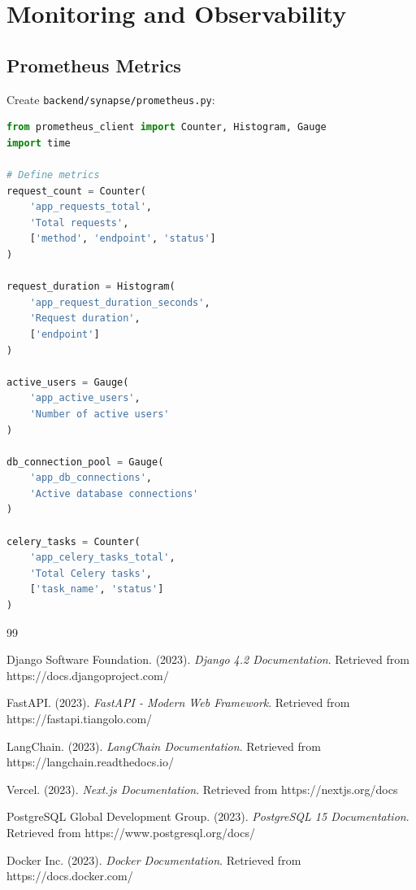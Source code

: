 \documentclass{report}
\begin{document}
\chapter{Monitoring and Observability}

\section{Prometheus Metrics}

Create \texttt{backend/synapse/prometheus.py}:

\begin{lstlisting}[language=python, caption=Prometheus metrics setup]
from prometheus_client import Counter, Histogram, Gauge
import time

# Define metrics
request_count = Counter(
    'app_requests_total',
    'Total requests',
    ['method', 'endpoint', 'status']
)

request_duration = Histogram(
    'app_request_duration_seconds',
    'Request duration',
    ['endpoint']
)

active_users = Gauge(
    'app_active_users',
    'Number of active users'
)

db_connection_pool = Gauge(
    'app_db_connections',
    'Active database connections'
)

celery_tasks = Counter(
    'app_celery_tasks_total',
    'Total Celery tasks',
    ['task_name', 'status']
)
\end{lstlisting}

\begin{thebibliography}{99}

 Django Software Foundation. (2023). \textit{Django 4.2 Documentation}. Retrieved from https://docs.djangoproject.com/

 FastAPI. (2023). \textit{FastAPI - Modern Web Framework}. Retrieved from https://fastapi.tiangolo.com/

 LangChain. (2023). \textit{LangChain Documentation}. Retrieved from https://langchain.readthedocs.io/

 Vercel. (2023). \textit{Next.js Documentation}. Retrieved from https://nextjs.org/docs

 PostgreSQL Global Development Group. (2023). \textit{PostgreSQL 15 Documentation}. Retrieved from https://www.postgresql.org/docs/

 Docker Inc. (2023). \textit{Docker Documentation}. Retrieved from https://docs.docker.com/

\end{thebibliography}
\end{document}
